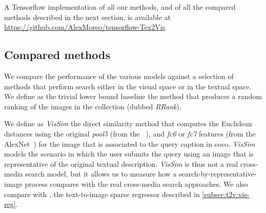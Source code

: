 
A Tensorflow implementation of all our methods, and of all the compared methods described in the next section, is available at \url{https://github.com/AlexMoreo/tensorflow-Tex2Vis}.

\subsection{Compared methods}
\label{subsec:t2v:compared-methods}

We compare the performance of the various \ttv{} models against a selection of methods that perform search either in the visual space or in the textual space.
We define as the trivial lower bound baseline the method that produces a random ranking of the images in the collection (dubbed \emph{RRank}).

We define as \emph{VisSim} the direct similarity method that computes the Euclidean distances using the original \emph{pool5} (from the \resnet{}~\cite{he2015deep}), and \emph{fc6} or \emph{fc7} features (from the AlexNet~\cite{zhou2014learning}) for the image that is associated to the query caption in \gls{coco}.
\emph{VisSim} models the scenario in which the user submits the query using an image that is representative of the original textual description.
\emph{VisSim} is thus not a real cross-media search model, but it allows us to measure how a search-by-representative-image process compares with the real cross-media search approaches.
We also compare with \visreg{}, the text-to-image sparse regressor described in \ref{subsec:t2v:vis-reg}.

